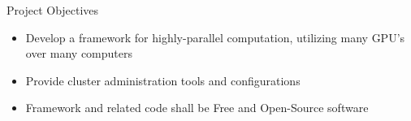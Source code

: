 \begin{block}{\Large Project Objectives}
\begin{itemize}
\item{Develop a framework for highly-parallel computation, utilizing many GPU's
over many computers}
\item{Provide cluster administration tools and configurations}
\item{Framework and related code shall be Free and Open-Source software}
\end{itemize}
\end{block}
